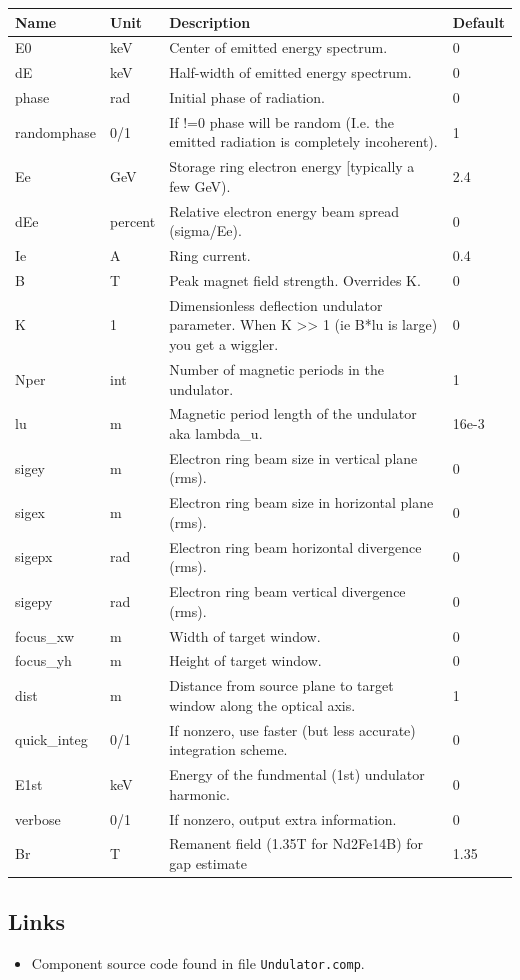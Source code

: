 \begin{longtable}{p{}p{}p{}p{}}
\toprule
\textbf{Name} & \textbf{Unit} & \textbf{Description} & \textbf{Default} \\
\midrule
\endhead
E0 & keV & Center of emitted energy spectrum. & 0 \\
dE & keV & Half-width of emitted energy spectrum. & 0 \\
phase & rad & Initial phase of radiation. & 0 \\
randomphase & 0/1 & If !=0 phase will be random (I.e. the emitted radiation is completely incoherent). & 1 \\
Ee & GeV & Storage ring electron energy [typically a few GeV). & 2.4 \\
dEe & percent & Relative electron energy beam spread (sigma/Ee). & 0 \\
Ie & A & Ring current. & 0.4 \\
B & T & Peak magnet field strength. Overrides K. & 0 \\
K & 1 & Dimensionless deflection undulator parameter. When K \textgreater{}\textgreater{} 1 (ie B*lu is large) you get a wiggler. & 0 \\
Nper & int & Number of magnetic periods in the undulator. & 1 \\
lu & m & Magnetic period length of the undulator aka lambda\_u. & 16e-3 \\
sigey & m & Electron ring beam size in vertical plane (rms). & 0 \\
sigex & m & Electron ring beam size in horizontal plane (rms). & 0 \\
sigepx & rad & Electron ring beam horizontal divergence (rms). & 0 \\
sigepy & rad & Electron ring beam vertical divergence (rms). & 0 \\
focus\_xw & m & Width of target window. & 0 \\
focus\_yh & m & Height of target window. & 0 \\
dist & m & Distance from source plane to target window along the optical axis. & 1 \\
quick\_integ & 0/1 & If nonzero, use faster (but less accurate) integration scheme. & 0 \\
E1st & keV & Energy of the fundmental (1st) undulator harmonic. & 0 \\
verbose & 0/1 & If nonzero, output extra information. & 0 \\
Br & T & Remanent field (1.35T for Nd2Fe14B) for gap estimate & 1.35 \\
\bottomrule
\end{longtable}

\subsection*{Links}
\begin{itemize}
  \item Component source code found in file \texttt{Undulator.comp}.
\end{itemize}
